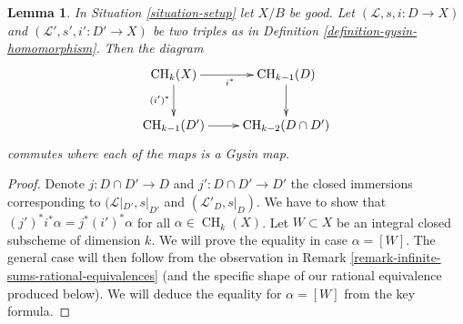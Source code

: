\documentclass{stacks-project}
\theoremstyle{plain}
\newtheorem{lemma}[subsection]{Lemma}
\theoremstyle{definition}
\theoremstyle{remark}
\numberwithin{equation}{subsection}
\def\CH{\mathop{\mathrm{CH}}\nolimits}
\begin{document}
\begin{lemma}
\label{lemma-gysin-commutes-gysin}
In Situation \ref{situation-setup} let $X/B$ be good.
Let $(\mathcal{L}, s, i : D \to X)$ and
$(\mathcal{L}', s', i' : D' \to X)$ be two triples as in
Definition \ref{definition-gysin-homomorphism}. Then the diagram
$$
\xymatrix{
\CH_k(X) \ar[r]_{i^*} \ar[d]_{(i')^*} & \CH_{k - 1}(D) \ar[d] \\
\CH_{k - 1}(D') \ar[r] & \CH_{k - 2}(D \cap D')
}
$$
commutes where each of the maps is a Gysin map.
\end{lemma}

\begin{proof}
Denote $j : D \cap D' \to D$ and $j' : D \cap D' \to D'$ the closed
immersions corresponding to $(\mathcal{L}|_{D'}, s|_{D'}$ and
$(\mathcal{L}'_D, s|_D)$. We have to show that
$(j')^*i^*\alpha = j^* (i')^*\alpha$ for all $\alpha \in \CH_k(X)$.
Let $W \subset X$ be an integral closed subscheme of dimension $k$.
We will prove the equality in case $\alpha = [W]$.
The general case will then follow from the observation in
Remark \ref{remark-infinite-sums-rational-equivalences}
(and the specific shape of our rational equivalence produced below).
We will deduce the equality for $\alpha = [W]$ from the key formula.


\end{proof}
\end{document}
